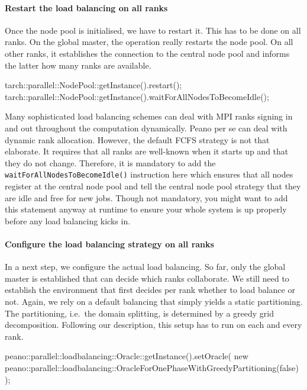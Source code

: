 \paragraph{Restart the load balancing on all ranks}
Once the node pool
is initialised, we have to restart it.
This has to be done on all ranks. 
On the global master, the operation really restarts the node pool.
On all other ranks, it establishes the connection to the central node pool
and informs the latter how many ranks are available.

\begin{code}
tarch::parallel::NodePool::getInstance().restart();
tarch::parallel::NodePool::getInstance().waitForAllNodesToBecomeIdle();
\end{code}

\begin{remark}
Many sophisticated load balancing schemes can deal with MPI ranks signing in and
out throughout the computation dynamically.
Peano per se can deal with dynamic rank allocation.  
However, the default FCFS strategy is not that elaborate. 
It requires that all ranks are well-known when it starts up and that they do not
change.
Therefore, it is mandatory to add the \texttt{waitForAllNodesToBecomeIdle()}
instruction here which ensures that all nodes register at the central node pool
and tell the central node pool strategy that they are idle and free for new
jobs. 
Though not mandatory, you might want to add this statement anyway at runtime to
ensure your whole system is up properly before any load balancing kicks in.
\end{remark}

\paragraph{Configure the load balancing strategy on all ranks}
In a next step, we configure the
actual load balancing.
So far, only the global master is established that can decide which ranks
collaborate.
We still need to establish the environment that first decides per rank whether
to load balance or not.
Again, we rely on a default balancing that simply yields
a static partitioning.
The partitioning, i.e.~the domain splitting, is determined by a greedy grid
decomposition.
Following our description, this setup has to run on each and every rank.

\begin{code}
peano::parallel::loadbalancing::Oracle::getInstance().setOracle(
 new peano::parallel::loadbalancing::OracleForOnePhaseWithGreedyPartitioning(false)
 );
\end{code}

